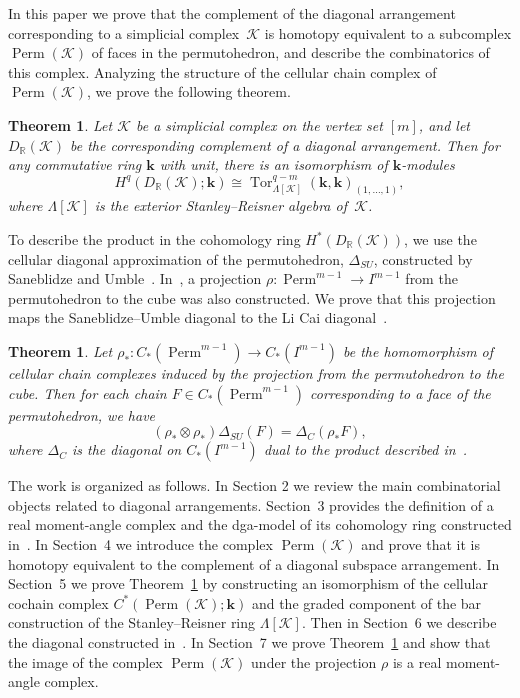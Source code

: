 \documentclass[a4paper,12pt]{amsart}
\newcommand{\K}{\mathcal K}
\newcommand{\RR}{\mathbb R}
\newcommand{\kk}{\mathbf{k}}
\newtheorem{theorem}[formula]{Theorem}
\theoremstyle{definition}
\theoremstyle{remark}
\numberwithin{equation}{section}
\DeclareMathOperator{\Perm}{Perm}
\DeclareMathOperator{\Tor}{Tor}
\begin{document}
In this paper we prove that the complement of the diagonal arrangement corresponding to a simplicial complex~$\K$ is homotopy equivalent to a subcomplex $\Perm(\K)$ of faces in the permutohedron, and describe the combinatorics of this complex.
Analyzing the structure of the cellular chain complex of $\Perm(\K)$, we prove the following theorem.

\begin{theorem}\label{theorem-intro1}
Let $\K$ be a simplicial complex on the vertex set $[m]$, and let $D_\RR(\K)$ be the corresponding complement of a diagonal arrangement.
Then for any commutative ring $\kk$ with unit, there is an isomorphism of $\kk$-modules
\[
  H^q(D_\RR(\K); \kk) \cong \Tor_{\Lambda[\K]}^{q-m}(\kk, \kk)_{(1, \ldots, 1 )},
\]
where $\Lambda[\K]$ is the exterior Stanley--Reisner algebra of~$\K$.
\end{theorem}

To describe the product in the cohomology ring $H^*(D_\RR(\K))$,
we use the cellular diagonal approximation of the permutohedron,  $\Delta_{SU}$, constructed by Saneblidze and Umble~\cite{SU}. In~\cite{SU}, a projection $\rho \colon \Perm^{m-1} \to I^{m-1}$ from the permutohedron to the cube was also constructed. We prove that this projection maps the Saneblidze--Umble diagonal to the Li Cai diagonal~\cite{LiCai}.

\begin{theorem}\label{theorem-intro2}
Let $\rho_* \colon C_*(\Perm^{m-1}) \to C_*(I^{m-1})$ be the homomorphism of cellular chain complexes induced by the projection from the permutohedron to the cube.
Then for each chain $F \in C_*(\Perm^{m-1})$ corresponding to a face of the permutohedron, we have
\[
  (\rho_* \otimes \rho_*)\Delta_{SU}(F) = \Delta_{C}(\rho_* F),
\]  
where $\Delta_{C}$ is the diagonal on $C_*(I^{m-1})$ dual to the product described in~\cite{LiCai}.
\end{theorem}

The work is organized as follows. In Section 2 we review the main combinatorial objects related to diagonal arrangements. Section~3 provides the definition of a real moment-angle complex and the dga-model of its cohomology ring constructed in~\cite{LiCai}.
In Section~4 we introduce the complex $\Perm(\K)$ and prove that it is homotopy equivalent to the complement of a diagonal subspace arrangement.
In Section~5 we prove Theorem~\ref{theorem-intro1} by constructing an isomorphism of the cellular cochain complex $C^*(\Perm(\K); \kk)$ and the graded component of the bar construction of the Stanley--Reisner ring $\Lambda[\K]$.
Then in Section~6 we describe the diagonal constructed in~\cite{SU}.
In Section~7 we prove Theorem~\ref{theorem-intro2} and show that the image of the complex $\Perm(\K)$ under the projection $\rho$ is a real moment-angle complex.
\end{document}
